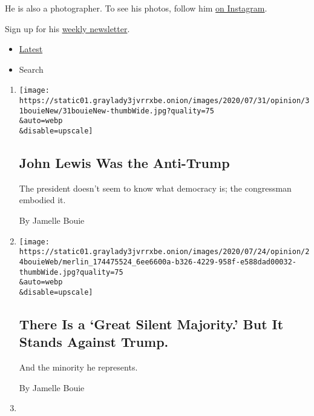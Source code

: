 He is also a photographer. To see his photos, follow him
\href{https://www.instagram.com/jbouie/?hl=en}{on Instagram}.

Sign up for his
\href{https://www.nytimes3xbfgragh.onion/newsletters/jamellebouie}{weekly
newsletter}.

\begin{itemize}
\tightlist
\item
  \protect\hyperlink{stream-panel}{Latest}
\item
  Search
\end{itemize}

\begin{enumerate}
\def\labelenumi{\arabic{enumi}.}
\item
  \href{/2020/07/31/opinion/john-lewis-trump-election-2020.html}{}

  \texttt{[image: https://static01.graylady3jvrrxbe.onion/images/2020/07/31/opinion/31bouieNew/31bouieNew-thumbWide.jpg?quality=75\\\&auto=webp\\\&disable=upscale]}

  \hypertarget{john-lewis-was-the-anti-trump}{%
  \subsection{John Lewis Was the
  Anti-Trump}\label{john-lewis-was-the-anti-trump}}

  The president doesn't seem to know what democracy is; the congressman
  embodied it.

  By Jamelle Bouie
\item
  \href{/2020/07/24/opinion/trump-silent-majority.html}{}

  \texttt{[image: https://static01.graylady3jvrrxbe.onion/images/2020/07/24/opinion/24bouieWeb/merlin\_174475524\_6ee6600a-b326-4229-958f-e588dad00032-thumbWide.jpg?quality=75\\\&auto=webp\\\&disable=upscale]}

  \hypertarget{there-is-a-great-silent-majority-but-it-stands-against-trump}{%
  \subsection{There Is a `Great Silent Majority.' But It Stands Against
  Trump.}\label{there-is-a-great-silent-majority-but-it-stands-against-trump}}

  And the minority he represents.

  By Jamelle Bouie
\item
  \href{/2020/07/21/opinion/portland-homeland-security.html}{}


\end{enumerate}
